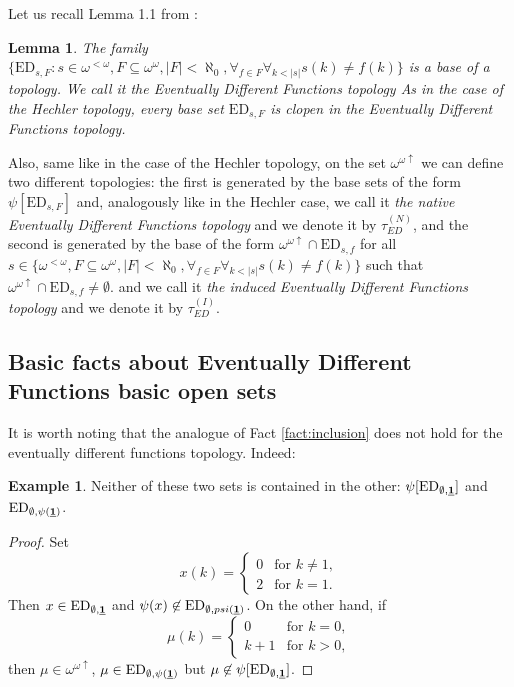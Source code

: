 \documentclass[12pt]{amsart}
\theoremstyle{plain}
\newtheorem{lemma}[theorem]{Lemma}
\theoremstyle{definition}
\newtheorem{example}[theorem]{Example}
\theoremstyle{remark}
\newcommand{\baire}{\omega^{\omega}}
\newcommand{\finbaire}{\omega^{<\omega}}
\newcommand{\incrbaire}{\omega^{\omega \uparrow}}
\newcommand{\EventuallyDifferent}[2]{\mathrm{ED}_{#1,#2}}
\newcommand{\EventuallyDifferentNative}{\tau_{\mathit{ED}}^{(N)}}
\newcommand{\EventuallyDifferentInduced}{\tau_{\mathit{ED}}^{(I)}}
\newcommand{\sequenceOnes}{\underline{\bf 1}}
\begin{document}
Let us recall Lemma 1.1 from \cite{Labedzki1996}:
\begin{lemma}
  The family $\lbrace \EventuallyDifferent{s}{F} \colon s \in \finbaire,
  F \subseteq \baire, |F| < \aleph_0,
  \forall_{f \in F} \forall_{k < |s|} s(k) \not= f(k)\rbrace$
  is a base of a topology.
  We call it {\it the Eventually Different Functions topology}
  As in the case of the Hechler topology,
  every base set $\EventuallyDifferent{s}{F}$ is clopen in the
  Eventually Different Functions topology.
\end{lemma}

Also, same like in the case of the Hechler topology,
on the set $\incrbaire$ we can define two different topologies:
the first is generated by the base sets of the form
$\psi[\EventuallyDifferent{s}{F}]$
and, analogously like in the Hechler case,
we call it {\it the native Eventually Different Functions topology} and
we denote it by $\EventuallyDifferentNative$, and the second is generated by the base
of the form $\incrbaire \cap \EventuallyDifferent{s}{f}$ for
all $s \in \lbrace\finbaire, F \subseteq \baire, |F| < \aleph_0,
\forall_{f \in F} \forall_{k < |s|} s(k) \not= f(k)\rbrace$
such that $\incrbaire \cap \EventuallyDifferent{s}{f} \not= \emptyset$. 
and we call it {\it the induced Eventually Different Functions topology}
and we denote it by $\EventuallyDifferentInduced$.

\subsection{Basic facts about Eventually Different Functions basic open sets}
It is worth noting that the analogue of
Fact \ref{fact:inclusion} does not hold 
for the eventually different functions topology.
Indeed:
\begin{example}
  Neither of these two sets is contained in the other:
$\psi[\EventuallyDifferent{\emptyset}{\sequenceOnes}]$ and
$\EventuallyDifferent{\emptyset}{\psi(\sequenceOnes)}$.
\end{example}
\begin{proof}
  Set
\[x(k) =
\begin{cases}
0 & \text{for } k \not= 1,\\
2 & \text{for } k = 1.
\end{cases}
\]
Then $x \in \EventuallyDifferent{\emptyset}{\sequenceOnes}$
and $\psi(x) \not\in \EventuallyDifferent{\emptyset}{psi(\sequenceOnes)}$.
On the other hand, if   
\[
  \mu(k) =
\begin{cases}
0 & \text{for } k = 0,\\
k + 1 & \text{for } k > 0,
\end{cases}
\]
then $\mu\in\incrbaire$,
$\mu \in \EventuallyDifferent{\emptyset}{\psi(\sequenceOnes)}$
but $\mu \not \in \psi[\EventuallyDifferent{\emptyset}{\sequenceOnes}]$.
\end{proof}  
\end{document}
